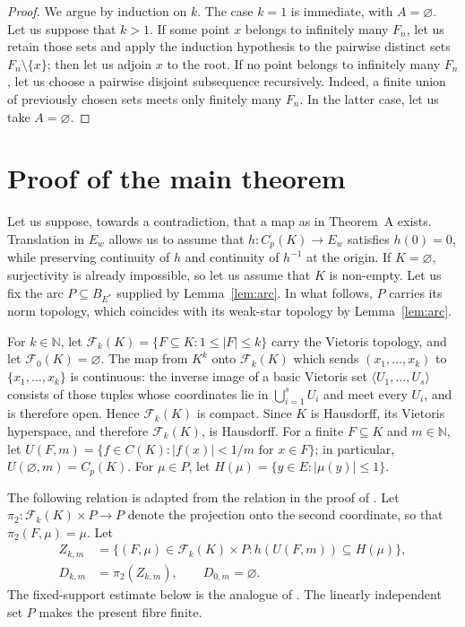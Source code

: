 \documentclass[10pt,a4paper]{amsart}
\newcommand{\N}{\mathbb{N}}
\newcommand{\abs}[1]{\lvert #1\rvert}
\newcommand{\Fin}{\mathcal F}
\begin{document}
\begin{proof}
We argue by induction on $k$.  The case $k=1$ is immediate, with
$A=\varnothing$.  Let us suppose that $k>1$.  If some point $x$ belongs to
infinitely many $F_n$, let us retain those sets and apply the induction
hypothesis to the pairwise distinct sets $F_n\setminus\{x\}$; then
let us adjoin $x$ to the root.  If no point belongs to infinitely many $F_n$,
let us choose a pairwise disjoint subsequence recursively.  Indeed, a finite
union of previously chosen sets meets only finitely many $F_n$.  In the
latter case, let us take $A=\varnothing$.
\end{proof}

\section{Proof of the main theorem}
\label{sec:main-proof}

Let us suppose, towards a contradiction, that a map as in Theorem~A exists.
Translation in $E_w$ allows us to assume that
$h\colon C_p(K)\to E_w$ satisfies $h(0)=0$,
while preserving continuity of $h$ and continuity of $h^{-1}$ at the
origin.  If $K=\varnothing$, surjectivity is already impossible, so let
us assume that $K$ is non-empty.  Let us fix the arc
$P\subseteq B_{E^*}$ supplied
by Lemma~\ref{lem:arc}.
In what follows, $P$ carries its norm topology, which coincides with
its weak-star topology by Lemma~\ref{lem:arc}.

For $k\in\N$, let
$\Fin_k(K)=\{F\subseteq K:1\leqslant\abs F\leqslant k\}$ carry the
Vietoris topology, and let $\Fin_0(K)=\varnothing$.  The map from $K^k$
onto $\Fin_k(K)$ which sends $(x_1,\ldots,x_k)$ to
$\{x_1,\ldots,x_k\}$ is continuous: the inverse image of a basic
Vietoris set $\langle U_1,\ldots,U_s\rangle$ consists of those tuples
whose coordinates lie in $\bigcup_{i=1}^s U_i$ and meet every $U_i$,
and is therefore open.  Hence $\Fin_k(K)$ is compact.  Since $K$ is
Hausdorff, its Vietoris hyperspace, and therefore $\Fin_k(K)$, is
Hausdorff.  For a
finite $F\subseteq K$ and $m\in\N$, let
$U(F,m)=\{f\in C(K):\abs{f(x)}<1/m\text{ for }x\in F\}$; in particular,
$U(\varnothing,m)=C_p(K)$.  For $\mu\in P$, let
$H(\mu)=\{y\in E:\abs{\mu(y)}\leqslant1\}$.

The following relation is adapted from the relation in the proof of
\cite[Theorem~4.1]{KrupskiMarciszewski2017}.  Let
$\pi_2\colon\Fin_k(K)\times P\to P$ denote the projection onto the
second coordinate, so that $\pi_2(F,\mu)=\mu$.  Let
\[
 \begin{split}
 Z_{k,m}&=\{(F,\mu)\in\Fin_k(K)\times P:
                    h(U(F,m))\subseteq H(\mu)\},\\
 D_{k,m}&=\pi_2(Z_{k,m}),\qquad D_{0,m}=\varnothing.
 \end{split}
\]
The fixed-support estimate below is the analogue of
\cite[Claim~1, p.~651]{KrupskiMarciszewski2017}.  The linearly independent
set $P$ makes the present fibre finite.
\end{document}
